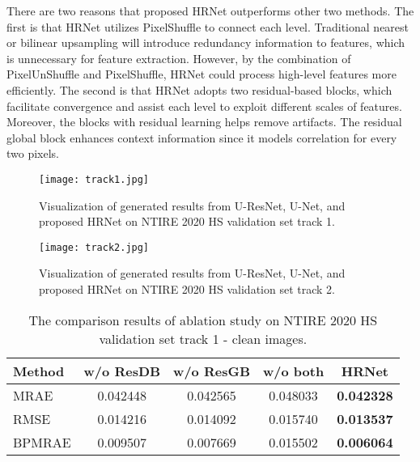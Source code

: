 \documentclass[10pt,twocolumn,letterpaper]{article}
\begin{document}
There are two reasons that proposed HRNet outperforms other two methods. The first is that HRNet utilizes PixelShuffle to connect each level. Traditional nearest or bilinear upsampling will introduce redundancy information to features, which is unnecessary for feature extraction. However, by the combination of PixelUnShuffle and PixelShuffle, HRNet could process high-level features more efficiently. The second is that HRNet adopts two residual-based blocks, which facilitate convergence and assist each level to exploit different scales of features. Moreover, the blocks with residual learning helps remove artifacts. The residual global block enhances context information since it models correlation for every two pixels.

\begin{figure*}[t]
\centering
\texttt{[image: track1.jpg]}
\caption{Visualization of generated results from U-ResNet, U-Net, and proposed HRNet on NTIRE 2020 HS validation set track 1.}
\label{v1}
\end{figure*}

\begin{figure*}[t]
\centering
\texttt{[image: track2.jpg]}
\caption{Visualization of generated results from U-ResNet, U-Net, and proposed HRNet on NTIRE 2020 HS validation set track 2.}
\label{v2}
\end{figure*}

\begin{table}[t]
\begin{center}
\begin{tabular}{lcccc}
\hline
Method & w/o ResDB & w/o ResGB & w/o both & HRNet \\
\hline
\hline
MRAE & 0.042448 & 0.042565 & 0.048033 & \textbf{0.042328} \\
RMSE & 0.014216 & 0.014092 & 0.015740 & \textbf{0.013537} \\
BPMRAE & 0.009507 & 0.007669 & 0.015502 & \textbf{0.006064} \\
\hline
\end{tabular}
\end{center}
\caption{The comparison results of ablation study on NTIRE 2020 HS validation set track 1 - clean images.}
\label{ablation}
\end{table}
\end{document}
